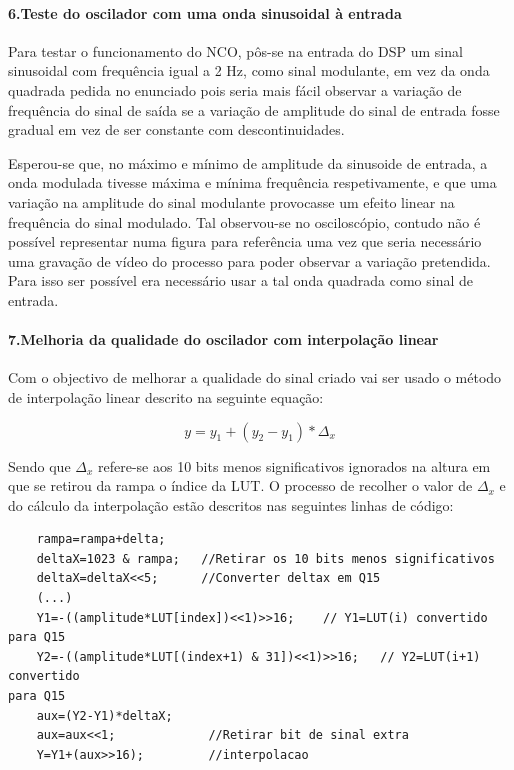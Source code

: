 \documentclass[11pt]{article}
\numberwithin{equation}{section}
\begin{document}
\paragraph{6.Teste do oscilador com uma onda sinusoidal à entrada} \label{para:P1-6} \hspace{0pt}

Para testar o funcionamento do NCO, pôs-se na entrada do DSP um sinal sinusoidal com frequência igual a 2 Hz, como sinal modulante, em vez da onda quadrada pedida no enunciado pois seria mais fácil observar a variação de frequência do sinal de saída se a variação de amplitude do sinal de entrada fosse gradual em vez de ser constante com descontinuidades. 
\vspace{1 mm}

Esperou-se que, no máximo e mínimo de amplitude da sinusoide de entrada, a onda modulada tivesse máxima e mínima frequência respetivamente, e que uma variação na amplitude do sinal modulante provocasse um efeito linear na frequência do sinal modulado. Tal observou-se no osciloscópio, contudo não é possível representar numa figura para referência uma vez que seria necessário uma gravação de vídeo do processo para poder observar a variação pretendida. Para isso ser possível era necessário usar a tal onda quadrada como sinal de entrada.

\paragraph{7.Melhoria da qualidade do oscilador com interpolação linear} \hspace{0pt}

Com o objectivo de melhorar a qualidade do sinal criado vai ser usado o método de interpolação linear descrito na seguinte equação:

\begin{equation}
y=y_{1}+(y_{2}-y_{1})*\Delta_{x}
\end{equation}

Sendo que $ \Delta_{x} $ refere-se aos 10 bits menos significativos ignorados na altura em que se retirou da rampa o índice da LUT. O processo de recolher o valor de $ \Delta_{x} $ e do cálculo da interpolação estão descritos nas seguintes linhas de código:
\begin{lstlisting}
	rampa=rampa+delta;
	deltaX=1023 & rampa;   //Retirar os 10 bits menos significativos
	deltaX=deltaX<<5;      //Converter deltax em Q15
	(...)
	Y1=-((amplitude*LUT[index])<<1)>>16;	// Y1=LUT(i) convertido para Q15
	Y2=-((amplitude*LUT[(index+1) & 31])<<1)>>16;	// Y2=LUT(i+1) convertido 
para Q15
	aux=(Y2-Y1)*deltaX;		
	aux=aux<<1;				//Retirar bit de sinal extra
	Y=Y1+(aux>>16);			//interpolacao	
\end{lstlisting}
\end{document}
